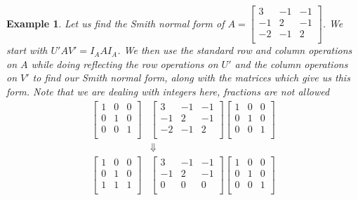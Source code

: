 \documentclass[11pt]{amsart}
\theoremstyle{plain}
\newtheorem{exa}{Example}
\theoremstyle{definition}
\begin{document}
\begin{exa}
  Let us find the Smith normal form of
  $
  A=\left[\begin{array}{rrr}
  3&-1&-1\\
  -1&2&-1\\
  -2&-1&2\\
  \end{array}\right]
  $. We start with $U'AV'=I_AAI_A$. We then use the standard row and column
  operations on $A$ while doing reflecting the row operations on $U'$ and the
  column operations on $V'$ to find our Smith normal form, along with the
  matrices which give us this form. Note that we are dealing with integers here,
  fractions are not allowed
  \begin{align*}
  \left[\begin{array}{rrr}
  1&0&0\\
  0&1&0\\
  0&0&1\\
  \end{array}\right]
  &
  \left[\begin{array}{rrr}
  3&-1&-1\\
  -1&2&-1\\
  -2&-1&2\\
  \end{array}\right]
  \left[\begin{array}{rrr}
  1&0&0\\
  0&1&0\\
  0&0&1\\
  \end{array}\right]\\
  &\Downarrow\\
  \left[\begin{array}{rrr}
  1&0&0\\
  0&1&0\\
  1&1&1\\
  \end{array}\right]
  &
  \left[\begin{array}{rrr}
  3&-1&-1\\
  -1&2&-1\\
  0&0&0\\
  \end{array}\right]
  \left[\begin{array}{rrr}
  1&0&0\\
  0&1&0\\
  0&0&1\\
  \end{array}\right]\\

\end{align*}
\end{exa}
\end{document}
